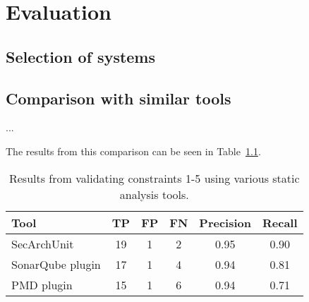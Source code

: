 \chapter{Evaluation}

\section{Selection of systems}

\section{Comparison with similar tools}
...

The results from this comparison can be seen in Table~\ref{tab:results_comparison}.

\begin{table}
\begin{center}
\begin{tabular}{lccccc}
\hline
\textbf{Tool} & \textbf{TP} & \textbf{FP} & \textbf{FN} & \textbf{Precision} & \textbf{Recall}\\
\hline
SecArchUnit & 19 & 1 & 2 & 0.95 & 0.90\\
\rowcolor{RowColor}
SonarQube plugin & 17 & 1 & 4 & 0.94 & 0.81\\
PMD plugin & 15 & 1 & 6 & 0.94 & 0.71\\
\hline
\end{tabular}
\end{center}
\caption{Results from validating constraints 1-5 using various static analysis tools.}
\label{tab:results_comparison}
\end{table}

